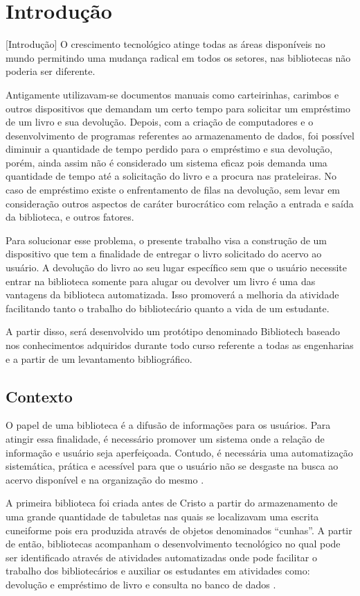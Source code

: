 \chapter{Introdução}[Introdução]
O crescimento tecnológico atinge todas as áreas disponíveis no mundo permitindo uma mudança radical em todos os setores, nas bibliotecas não poderia ser diferente.

Antigamente utilizavam-se documentos manuais como carteirinhas, carimbos e outros dispositivos que demandam um certo tempo para solicitar um empréstimo de um livro e sua devolução. Depois, com a criação de computadores e o desenvolvimento de programas referentes ao armazenamento de dados, foi possível diminuir a quantidade de tempo perdido para o empréstimo e sua devolução, porém, ainda assim não é considerado um sistema eficaz pois demanda uma quantidade de tempo até a solicitação do livro e a procura nas prateleiras. No caso de empréstimo existe o enfrentamento de filas na devolução, sem levar em consideração outros aspectos de caráter burocrático com relação a entrada e saída da biblioteca, e outros fatores.

Para solucionar esse problema, o presente trabalho visa a construção de um dispositivo que tem a finalidade de entregar o livro solicitado do acervo ao usuário. A devolução do livro ao seu lugar específico sem que o usuário necessite entrar na biblioteca somente para alugar ou devolver um livro é uma das vantagens da biblioteca automatizada. Isso promoverá a melhoria da atividade facilitando tanto o trabalho do bibliotecário quanto a vida de um estudante.

A partir disso, será desenvolvido um protótipo denominado Bibliotech baseado nos conhecimentos adquiridos durante todo curso referente a todas as engenharias e a partir de um levantamento bibliográfico.

\section{Contexto}

O papel de uma biblioteca é a difusão de informações para os usuários. Para atingir essa finalidade, é necessário promover um sistema onde a relação de informação e usuário seja aperfeiçoada. Contudo, é necessária uma automatização sistemática, prática e acessível para que o usuário não se desgaste na busca ao acervo disponível e na organização do mesmo \cite{melo2014}. 

A primeira biblioteca foi criada antes de Cristo a partir do armazenamento de uma grande quantidade de tabuletas nas quais se localizavam uma escrita cuneiforme pois era produzida através de objetos denominados “cunhas”. A partir de então, bibliotecas acompanham o desenvolvimento tecnológico no qual pode ser identificado através de atividades automatizadas onde pode facilitar o trabalho dos bibliotecários e auxiliar os estudantes em atividades como: devolução e empréstimo de livro e consulta no banco de dados \cite{santana2015}.

